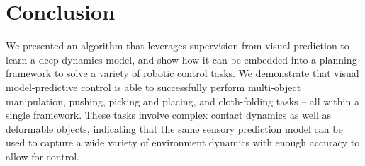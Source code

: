 \documentclass[10pt,journal,compsoc]{IEEEtran}
\begin{document}
\maketitle


\IEEEdisplaynontitleabstractindextext


\IEEEpeerreviewmaketitle




















\section{Conclusion}
We presented an algorithm that leverages supervision from visual prediction to learn a deep dynamics model, and show how it can be embedded into a  planning framework to solve a variety of robotic control tasks. We demonstrate that visual model-predictive control is able to successfully perform multi-object manipulation, pushing, picking and placing, and cloth-folding tasks -- all within a single framework. These tasks involve complex contact dynamics as well as deformable objects, indicating that the same sensory prediction model can be used to capture a wide variety of environment dynamics with enough accuracy to allow for control.
\end{document}
